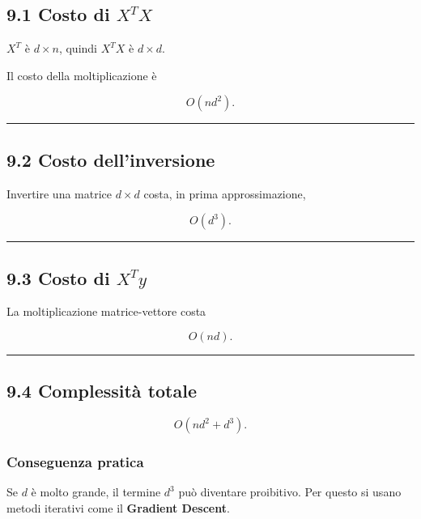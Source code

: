 \documentclass{article}
\begin{document}
\subsection{\texorpdfstring{9.1 Costo di
\(X^TX\)}{9.1 Costo di X\^{}TX}}\label{costo-di-xtx}

\(X^T\) è \(d\times n\), quindi \(X^TX\) è \(d\times d\).

Il costo della moltiplicazione è

\[
O(nd^2).
\]

\begin{center}\rule{0.5\linewidth}{0.5pt}\end{center}

\subsection{9.2 Costo dell'inversione}\label{costo-dellinversione}

Invertire una matrice \(d\times d\) costa, in prima approssimazione,

\[
O(d^3).
\]

\begin{center}\rule{0.5\linewidth}{0.5pt}\end{center}

\subsection{\texorpdfstring{9.3 Costo di
\(X^Ty\)}{9.3 Costo di X\^{}Ty}}\label{costo-di-xty}

La moltiplicazione matrice-vettore costa

\[
O(nd).
\]

\begin{center}\rule{0.5\linewidth}{0.5pt}\end{center}

\subsection{9.4 Complessità totale}\label{complessituxe0-totale}

\[
O(nd^2 + d^3).
\]

\subsubsection{Conseguenza pratica}\label{conseguenza-pratica}

Se \(d\) è molto grande, il termine \(d^3\) può diventare proibitivo.
Per questo si usano metodi iterativi come il \textbf{Gradient Descent}.
\end{document}

